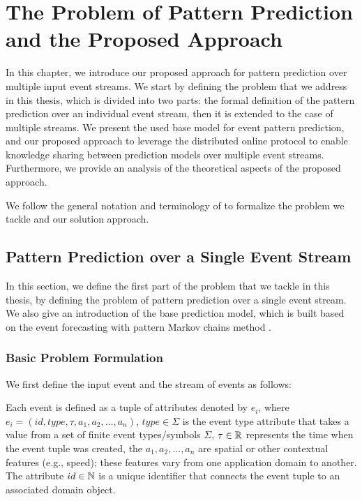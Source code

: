 \chapter{ The Problem of Pattern Prediction and the Proposed Approach }

\label{chapter:system}

\par In this chapter, we introduce our proposed approach for pattern prediction over multiple input event streams. We start by defining the problem that we address in this thesis, which is divided into two parts: the formal definition of the pattern prediction over an individual event stream, then it is extended to the case of multiple streams. We present the used base model for event pattern prediction, and our proposed approach to leverage the distributed online protocol to enable knowledge sharing between prediction models over multiple event streams. Furthermore, we provide an analysis of the theoretical aspects of the proposed approach.

\par We follow the general notation and terminology of \cite{agrawal2008efficient,schultz2009distributed,luckham2008power,alevizos2015complex,zhou_pattern_2015,kamp2014communication} to formalize the problem we tackle and our solution approach.


\section{Pattern Prediction over a Single Event Stream}


\par In this section, we define the first part of the problem that we tackle in this thesis, by defining the problem of pattern prediction over a single event stream. We also give an introduction of the base prediction model, which is built based on the event forecasting with pattern Markov chains method \cite{alevizos2017event}.


\subsection{Basic Problem Formulation}

We first define the input event and the stream of events as follows:  
\begin{definition}
	Each event is defined as a tuple of attributes denoted by $e_i$, where 
	$e_i = (id,type,\tau,a_1,a_2,\ldots,a_n)$, $type\in\Sigma$ is the event type attribute that takes a value from a set of finite event types/symbols $\Sigma$, $\tau\in\mathbb{R}$ represents the time when the event tuple was created,  the  $a_1,a_2,...,a_n$ are spatial or other contextual features (e.g., speed); these features vary from one application domain to another. The attribute $id\in\mathbb{N}$ is a unique identifier that connects the event tuple to an associated domain object.
\end{definition}

